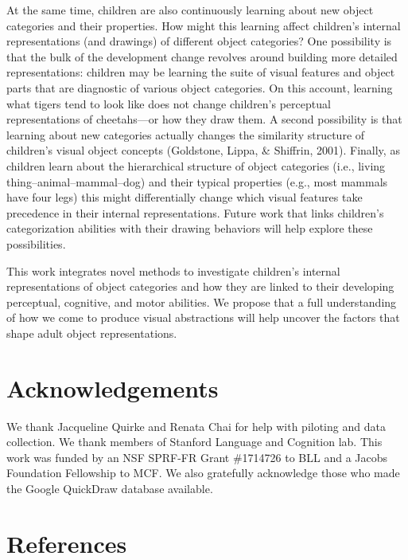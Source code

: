 \documentclass[10pt, letterpaper]{article}
\begin{document}
At the same time, children are also continuously learning about new
object categories and their properties. How might this learning affect
children's internal representations (and drawings) of different object
categories? One possibility is that the bulk of the development change
revolves around building more detailed representations: children may be
learning the suite of visual features and object parts that are
diagnostic of various object categories. On this account, learning what
tigers tend to look like does not change children's perceptual
representations of cheetahs---or how they draw them. A second
possibility is that learning about new categories actually changes the
similarity structure of children's visual object concepts (Goldstone,
Lippa, \& Shiffrin, 2001). Finally, as children learn about the
hierarchical structure of object categories (i.e., living
thing--animal--mammal--dog) and their typical properties (e.g., most
mammals have four legs) this might differentially change which visual
features take precedence in their internal representations. Future work
that links children's categorization abilities with their drawing
behaviors will help explore these possibilities.

This work integrates novel methods to investigate children's internal
representations of object categories and how they are linked to their
developing perceptual, cognitive, and motor abilities. We propose that a
full understanding of how we come to produce visual abstractions will
help uncover the factors that shape adult object representations.

\vspace{1em}

\vspace{1em}

\section{Acknowledgements}\label{acknowledgements}

We thank Jacqueline Quirke and Renata Chai for help with piloting and
data collection. We thank members of Stanford Language and Cognition
lab. This work was funded by an NSF SPRF-FR Grant \#1714726 to BLL and a
Jacobs Foundation Fellowship to MCF. We also gratefully acknowledge
those who made the Google QuickDraw database available.

\section{References}\label{references}
\end{document}
